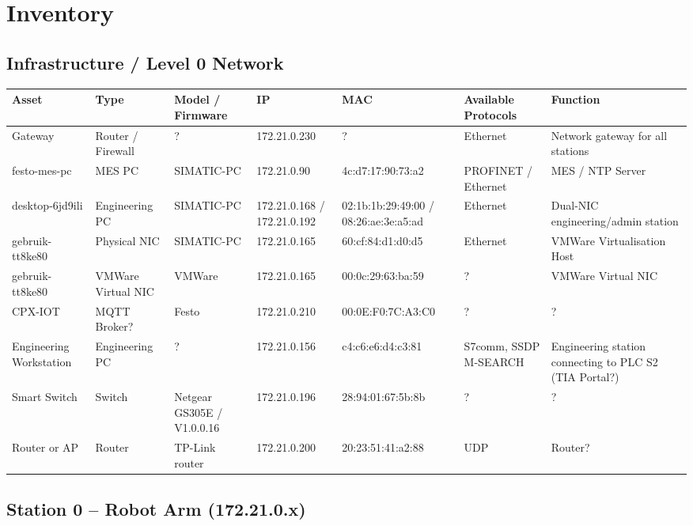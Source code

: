 \section{Inventory}

\subsection{Infrastructure / Level 0 Network}

\begin{adjustbox}{max width=\textwidth}
\begin{tabular}{lllllll}
\toprule
\textbf{Asset} & \textbf{Type} & \textbf{Model / Firmware} & \textbf{IP} & \textbf{MAC} & \textbf{Available Protocols} & \textbf{Function} \\
\midrule
Gateway & Router / Firewall & ? & 172.21.0.230 & ? & Ethernet & Network gateway for all stations \\
festo-mes-pc & MES PC & SIMATIC-PC & 172.21.0.90 & 4c:d7:17:90:73:a2 & PROFINET / Ethernet & MES / NTP Server \\
desktop-6jd9ili & Engineering PC & SIMATIC-PC & 172.21.0.168 / 172.21.0.192 & 02:1b:1b:29:49:00 / 08:26:ae:3e:a5:ad & Ethernet & Dual-NIC engineering/admin station \\
gebruik-tt8ke80 & Physical NIC & SIMATIC-PC & 172.21.0.165 & 60:cf:84:d1:d0:d5 & Ethernet & VMWare Virtualisation Host \\
gebruik-tt8ke80 & VMWare Virtual NIC & VMWare & 172.21.0.165 & 00:0c:29:63:ba:59 & ? & VMWare Virtual NIC \\
CPX-IOT & MQTT Broker? & Festo & 172.21.0.210 & 00:0E:F0:7C:A3:C0 & ? & ? \\
Engineering Workstation & Engineering PC & ? & 172.21.0.156 & c4:c6:e6:d4:c3:81 & S7comm, SSDP M-SEARCH & Engineering station connecting to PLC S2 (TIA Portal?) \\
Smart Switch & Switch & Netgear GS305E / V1.0.0.16 & 172.21.0.196 & 28:94:01:67:5b:8b & ? & ? \\
Router or AP & Router & TP-Link router & 172.21.0.200 & 20:23:51:41:a2:88 & UDP & Router? \\
\bottomrule
\end{tabular}
\end{adjustbox}

\subsection{Station 0 – Robot Arm (172.21.0.x)}


